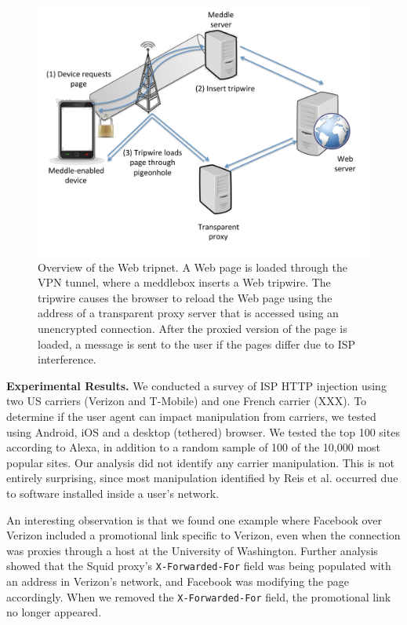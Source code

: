 \begin{figure}
\centering
        \includegraphics[width=\linewidth]{figs/tripnet.pdf}
\vspace{\figcapspace}
  \caption{Overview of the \meddle Web tripnet. A Web page is loaded 
through the VPN tunnel, where a meddlebox inserts a Web tripwire. The 
tripwire causes the browser to reload the Web page using the address of a
transparent proxy server that is accessed using an unencrypted connection. 
After the proxied version of the page is loaded, a message is sent to the user if 
the pages differ due to ISP interference. }
  \label{fig:tripnet}
\vspace{\postfigspace}
\end{figure}

\noindent\textbf{Experimental Results.} We conducted a survey of ISP HTTP injection using two US carriers (Verizon and T-Mobile) 
and one French carrier (XXX). To determine if the user agent can impact manipulation from 
carriers, we tested using Android, iOS and a desktop (tethered) browser. We tested the top 
100 sites according to Alexa, in addition to a random sample of 100 of the 10,000 most popular 
sites. Our analysis did not identify any carrier manipulation. This is not entirely surprising, 
since most manipulation identified by Reis et al. occurred due to software installed inside 
a user's network.

An interesting observation is that 
we found one example where Facebook over Verizon included a promotional link specific to 
Verizon, even when the connection was proxies through a host at the University of Washington. 
Further analysis showed that the Squid proxy's {\tt X-Forwarded-For} field was being populated 
with an address in Verizon's network, and Facebook was modifying the page accordingly. When 
we removed the {\tt X-Forwarded-For} field, the promotional link no longer appeared. 

